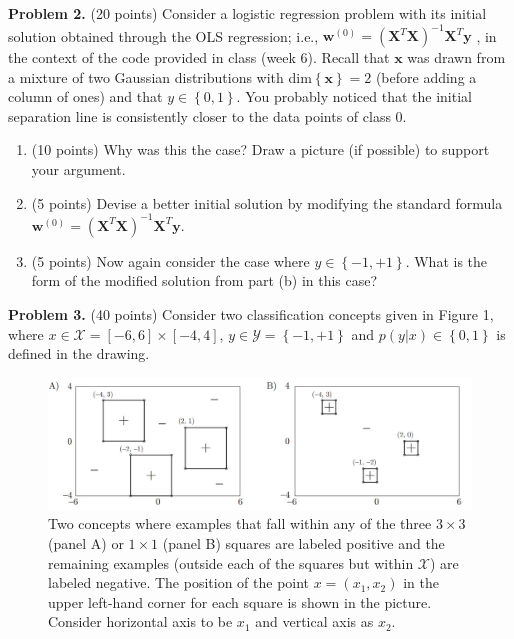 \documentclass[twoside]{article}
\begin{document}

\textbf{Problem 2.} (20 points) Consider a logistic regression problem with its initial solution obtained through the OLS regression; i.e., $\mathbf{w}^{(0)}=(\mathbf{X}^{T}\mathbf{X})^{-1}\mathbf{X}^{T}\mathbf{y}$
, in the context of the code provided in class (week 6). Recall that $\mathbf{x}$ was drawn from a mixture of two Gaussian distributions with dim$\left\{ \mathbf{x}\right\}=2$ (before adding a column of ones) and that $y \in \left\{ 0, 1\right\}$. You probably noticed that the initial separation line is consistently closer to the data points of class 0.

\begin{enumerate}
\item (10 points) Why was this the case? Draw a picture (if possible) to support your argument.
\item (5 points) Devise a better initial solution by modifying the standard formula $\mathbf{w}^{(0)}=(\mathbf{X}^{T}\mathbf{X})^{-1}\mathbf{X}^{T}\mathbf{y}$.
\item (5 points) Now again consider the case where $y \in \left\{ -1, +1\right\}$. What is the form of the
modified solution from part (b) in this case?
\end{enumerate}


\textbf{Problem 3.} (40 points) Consider two classification concepts given in Figure 1, where $x\in\mathcal{X}=[-6,6]\times[-4,4]$, $y\in\mathcal{Y}=\left\{-1,+1\right\}$ and $p(y|x) \in \left \{0,1\right \}$ is defined in the drawing. 

\begin{figure}[h]
\centering
\includegraphics[width=\linewidth]{graphic.jpg}
\caption{Two concepts where examples that fall within any of the three $3\times3$ (panel A) or $1\times1$ (panel B) squares are labeled positive and the remaining examples (outside each of the squares but within $\mathcal{X}$) are labeled negative. The position of the point $x=(x_1,x_2)$ in the upper left-hand corner for each square is shown in the picture. Consider horizontal axis to be $x_1$ and vertical axis as $x_2$.}
\label{fig:homology}
\end{figure}
\end{document}

